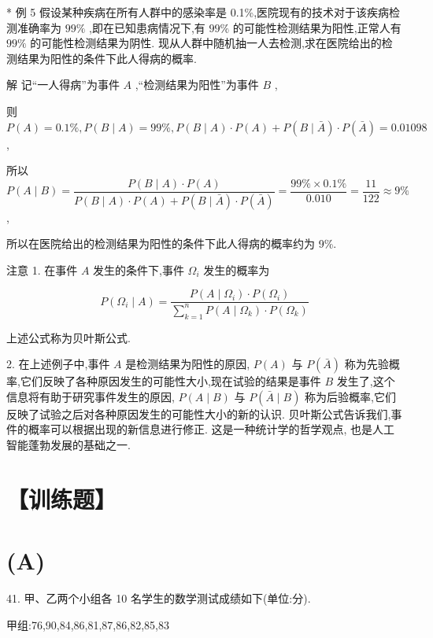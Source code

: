* 例 5 假设某种疾病在所有人群中的感染率是 0.1\%,医院现有的技术对于该疾病检测准确率为 ${99}\%$ ,即在已知患病情况下,有 ${99}\%$ 的可能性检测结果为阳性,正常人有 ${99}\%$ 的可能性检测结果为阴性. 现从人群中随机抽一人去检测,求在医院给出的检测结果为阳性的条件下此人得病的概率.

解 记“一人得病”为事件 $A$ ,“检测结果为阳性”为事件 $B$ ,

则 $P\left( A\right)  = {0.1}\% ,P\left( {B \mid  A}\right)  = {99}\% ,P\left( {B \mid  A}\right)  \cdot  P\left( A\right)  + P\left( {B \mid  \bar{A}}\right)  \cdot  P\left( \bar{A}\right)  = {0.01098}$ ,

所以 $P\left( {A \mid  B}\right)  = \dfrac{P\left( {B \mid  A}\right)  \cdot  P\left( A\right) }{P\left( {B \mid  A}\right)  \cdot  P\left( A\right)  + P\left( {B \mid  \bar{A}}\right)  \cdot  P\left( \bar{A}\right) } = \dfrac{{99}\%  \times  {0.1}\% }{0.010} = \dfrac{11}{122} \approx  9\%$ ,

所以在医院给出的检测结果为阳性的条件下此人得病的概率约为 9\%.

注意 1. 在事件 $A$ 发生的条件下,事件 ${\Omega }_{i}$ 发生的概率为

\[
P\left( {{\Omega }_{i} \mid  A}\right)  = \dfrac{P\left( {A \mid  {\Omega }_{i}}\right)  \cdot  P\left( {\Omega }_{i}\right) }{\mathop{\sum }\limits_{{k = 1}}^{n}P\left( {A \mid  {\Omega }_{k}}\right)  \cdot  P\left( {\Omega }_{k}\right) }
\]

上述公式称为贝叶斯公式.

2. 在上述例子中,事件 $A$ 是检测结果为阳性的原因, $P\left( A\right)$ 与 $P\left( \bar{A}\right)$ 称为先验概率,它们反映了各种原因发生的可能性大小,现在试验的结果是事件 $B$ 发生了,这个信息将有助于研究事件发生的原因, $P\left( {A \mid  B}\right)$ 与 $P\left( {\bar{A} \mid  B}\right)$ 称为后验概率,它们反映了试验之后对各种原因发生的可能性大小的新的认识. 贝叶斯公式告诉我们,事件的概率可以根据出现的新信息进行修正. 这是一种统计学的哲学观点, 也是人工智能蓬勃发展的基础之一.

\section*{【训练题】}

\section*{(A)}

41. 甲、乙两个小组各 10 名学生的数学测试成绩如下(单位:分).

甲组:76,90,84,86,81,87,86,82,85,83

